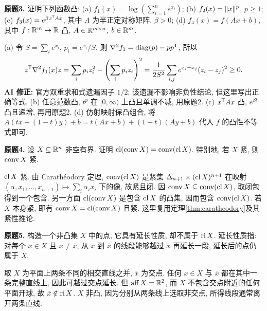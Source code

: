 \begin{exercise}\label{ass:6253-hw1-q3}
\textbf{原题3.} 证明下列函数凸:
(a) $f_1(x)=\log(\sum_{i=1}^n e^{x_i})$;
(b) $f_2(x)=\lVert x\rVert^p$, $p\ge1$;
(c) $f_3(x)=e^{\beta x^{\mathsf T} Ax}$, 其中 $A$ 为半正定对称矩阵, $\beta>0$;
(d) $f_4(x)=f(Ax+b)$, 其中 $f:\mathbb R^m\to\mathbb R$ 凸, $A\in\mathbb R^{m\times n}$, $b\in\mathbb R^m$.
\end{exercise}
\begin{solution}
(a) 令 $S=\sum_i e^{x_i}$, $p_i=e^{x_i}/S$. 则 $\nabla^2f_1=\operatorname{diag}(p)-pp^{\mathsf T}$, 所以
\[
z^{\mathsf T}\nabla^2f_1(x)z=\sum_i p_i z_i^2-\left(\sum_i p_i z_i\right)^2
=\frac{1}{2S^2}\sum_{i,j}e^{x_i+x_j}(z_i-z_j)^2\ge0.
\]
\textbf{AI 修正:} 官方双重求和式遗漏因子 $1/2$; 该遗漏不影响非负性结论, 但这里写出正确等式.
(b) 任意范数凸, $t^p$ 在 $[0,\infty)$ 上凸且单调不减, 用原题2.
(c) $x^{\mathsf T} Ax$ 凸, $e^{\beta t}$ 凸且递增, 再用原题2.
(d) 仿射映射保凸组合, 将 $A(tx+(1-t)y)+b=t(Ax+b)+(1-t)(Ay+b)$ 代入 $f$ 的凸性不等式即可.
\end{solution}

\begin{exercise}\label{ass:6253-hw1-q4}
\textbf{原题4.} 设 $X\subseteq\mathbb R^n$ 非空有界. 证明 $\operatorname{cl}(\operatorname{conv} X)=\operatorname{conv}(\operatorname{cl} X)$. 特别地, 若 $X$ 紧, 则 $\operatorname{conv} X$ 紧.
\end{exercise}
\begin{solution}
$\operatorname{cl} X$ 紧. 由 Carath\'eodory 定理, $\operatorname{conv}(\operatorname{cl} X)$ 是紧集 $\Delta_{n+1}\times(\operatorname{cl} X)^{n+1}$ 在映射 $(\alpha,x_1,\ldots,x_{n+1})\mapsto\sum_i\alpha_i x_i$ 下的像, 故紧且闭. 因 $\operatorname{conv} X\subseteq\operatorname{conv}(\operatorname{cl} X)$, 取闭包得到一个包含. 另一方面 $\operatorname{cl}(\operatorname{conv} X)$ 是包含 $\operatorname{cl} X$ 的凸集, 因而包含 $\operatorname{conv}(\operatorname{cl} X)$. 若 $X$ 本身紧, 即有 $\operatorname{conv} X=\operatorname{cl}(\operatorname{conv} X)$ 且紧. 这里复用定理\ref{thm:caratheodory}及其紧性推论.
\end{solution}

\begin{exercise}\label{ass:6253-hw1-q5}
\textbf{原题5.} 构造一个非凸集 $X$ 中的点, 它具有延长性质, 却不属于 $\operatorname{ri} X$. 延长性质指: 对每个 $x\in X$ 且 $x\ne\bar x$, 从 $x$ 到 $\bar x$ 的线段能够越过 $\bar x$ 再延长一段, 延长后的点仍属于 $X$.
\end{exercise}
\begin{solution}
取 $X$ 为平面上两条不同的相交直线之并, $\bar x$ 为交点. 任何 $x\in X$ 与 $\bar x$ 都在其中一条完整直线上, 因此可越过交点延长. 但 $\operatorname{aff} X=\mathbb R^2$, 而 $X$ 不包含交点附近的任何平面开球, 故 $\bar x\notin\operatorname{ri} X$. $X$ 非凸, 因为分别从两条线上选取非交点, 所得线段通常离开两条直线.
\end{solution}

